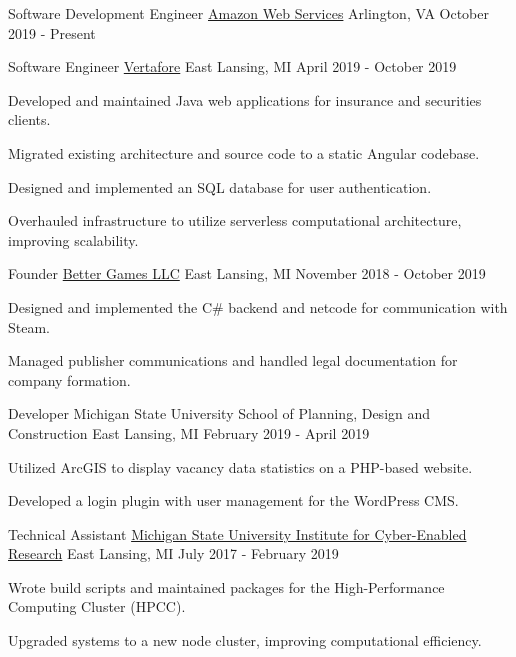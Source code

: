 
\begin{cventries}

  \cventry
    {Software Development Engineer} %
    {\href{https://aws.amazon.com}{Amazon Web Services}} %
    {Arlington, VA} %
    {October 2019 - Present} %
    {
      \begin{cvitems}
      \end{cvitems}
    }

  \cventry
    {Software Engineer}
    {\href{https://www.vertafore.com}{Vertafore}}
    {East Lansing, MI}
    {April 2019 - October 2019}
    {
      \begin{cvitems}
        \item {Developed and maintained Java web applications for insurance and securities clients.}
        \item {Migrated existing architecture and source code to a static Angular codebase.}
        \item {Designed and implemented an SQL database for user authentication.}
        \item {Overhauled infrastructure to utilize serverless computational architecture, improving scalability.}
      \end{cvitems}
    }

  \cventry
    {Founder}
    {\href{https://better-games.org}{Better Games LLC}}
    {East Lansing, MI}
    {November 2018 - October 2019}
    {
      \begin{cvitems}
        \item {Designed and implemented the C\# backend and netcode for communication with Steam.}
        \item {Managed publisher communications and handled legal documentation for company formation.}
      \end{cvitems}
    }

  \cventry
    {Developer}
    {Michigan State University School of Planning, Design and Construction}
    {East Lansing, MI}
    {February 2019 - April 2019}
    {
      \begin{cvitems}
        \item {Utilized ArcGIS to display vacancy data statistics on a PHP-based website.}
        \item {Developed a login plugin with user management for the WordPress CMS.}
      \end{cvitems}
    }

  \cventry
    {Technical Assistant}
    {\href{https://icer.msu.edu}{Michigan State University Institute for Cyber-Enabled Research}}
    {East Lansing, MI}
    {July 2017 - February 2019}
    {
      \begin{cvitems}
        \item {Wrote build scripts and maintained packages for the High-Performance Computing Cluster (HPCC).}
        \item {Upgraded systems to a new node cluster, improving computational efficiency.}
      \end{cvitems}
    }


\end{cventries}
